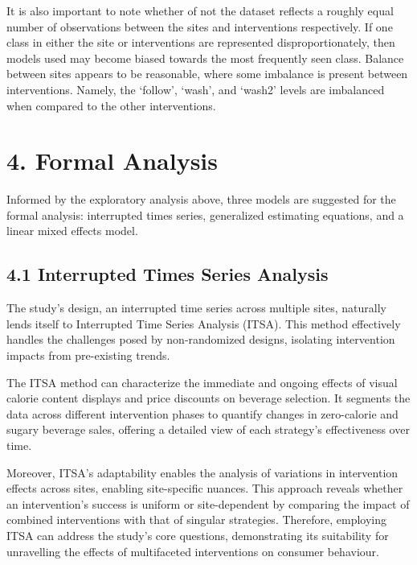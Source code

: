 \documentclass[
]{article}
\begin{document}
It is also important to note whether of not the dataset reflects a roughly equal number of observations between the sites and interventions respectively. If one class in either the site or interventions are represented disproportionately, then models used may become biased towards the most frequently seen class. Balance between sites appears to be reasonable, where some imbalance is present between interventions. Namely, the `follow', `wash', and `wash2' levels are imbalanced when compared to the other interventions.

\hypertarget{formal-analysis}{%
\section{4. Formal Analysis}\label{formal-analysis}}

Informed by the exploratory analysis above, three models are suggested for the formal analysis: interrupted times series, generalized estimating equations, and a linear mixed effects model.

\hypertarget{interrupted-times-series-analysis}{%
\subsection{4.1 Interrupted Times Series Analysis}\label{interrupted-times-series-analysis}}

The study's design, an interrupted time series across multiple sites, naturally lends itself to Interrupted Time Series Analysis (ITSA). This method effectively handles the challenges posed by non-randomized designs, isolating intervention impacts from pre-existing trends.

The ITSA method can characterize the immediate and ongoing effects of visual calorie content displays and price discounts on beverage selection. It segments the data across different intervention phases to quantify changes in zero-calorie and sugary beverage sales, offering a detailed view of each strategy's effectiveness over time.

Moreover, ITSA's adaptability enables the analysis of variations in intervention effects across sites, enabling site-specific nuances. This approach reveals whether an intervention's success is uniform or site-dependent by comparing the impact of combined interventions with that of singular strategies. Therefore, employing ITSA can address the study's core questions, demonstrating its suitability for unravelling the effects of multifaceted interventions on consumer behaviour.
\end{document}
